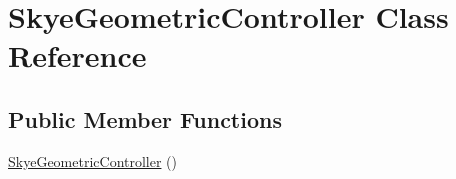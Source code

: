 \hypertarget{class_skye_geometric_controller}{\section{Skye\-Geometric\-Controller Class Reference}
\label{class_skye_geometric_controller}
}
\subsection*{Public Member Functions}
\begin{DoxyCompactItemize}
\item 
\hypertarget{class_skye_geometric_controller_a40739735f7c55b861647ecad873080ac}{\hyperlink{class_skye_geometric_controller_a40739735f7c55b861647ecad873080ac}{Skye\-Geometric\-Controller} ()}\label{class_skye_geometric_controller_a40739735f7c55b861647ecad873080ac}


\end{DoxyCompactItemize}
